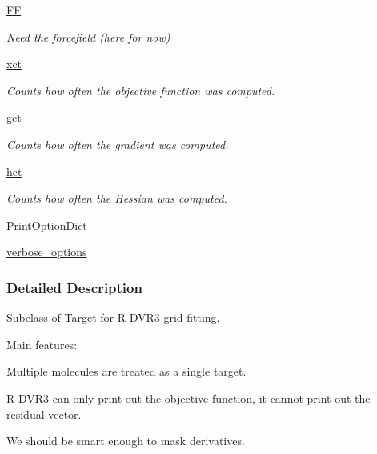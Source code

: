 \begin{DoxyCompactItemize}
\hyperlink{classforcebalance_1_1target_1_1Target_a38a37919783141ea37fdcf8b00ce0aaf}{F\-F}
\begin{DoxyCompactList}\small\item\em Need the forcefield (here for now) \end{DoxyCompactList}\item 
\hyperlink{classforcebalance_1_1target_1_1Target_aad2e385cfbf7b4a68f1c2cb41133fe82}{xct}
\begin{DoxyCompactList}\small\item\em Counts how often the objective function was computed. \end{DoxyCompactList}\item 
\hyperlink{classforcebalance_1_1target_1_1Target_aa625ac88c6744eb14ef281d9496d0dbb}{gct}
\begin{DoxyCompactList}\small\item\em Counts how often the gradient was computed. \end{DoxyCompactList}\item 
\hyperlink{classforcebalance_1_1target_1_1Target_a5b5a42f78052b47f29ed4b940c6111a1}{hct}
\begin{DoxyCompactList}\small\item\em Counts how often the Hessian was computed. \end{DoxyCompactList}\item 
\hyperlink{classforcebalance_1_1baseclass_1_1ForceBalanceBaseClass_a5c55e661e746d1a4443f4e0bc34ebe05}{Print\-Option\-Dict}
\item 
\hyperlink{classforcebalance_1_1baseclass_1_1ForceBalanceBaseClass_a8088e1e20cbd6bc175fb9c9fe9fa0f18}{verbose\-\_\-options}
\end{DoxyCompactItemize}


\subsubsection{Detailed Description}
Subclass of Target for R-\/\-D\-V\-R3 grid fitting. 

Main features\-:
\begin{DoxyItemize}
\item Multiple molecules are treated as a single target.
\item R-\/\-D\-V\-R3 can only print out the objective function, it cannot print out the residual vector.
\item We should be smart enough to mask derivatives. 
\end{DoxyItemize}

